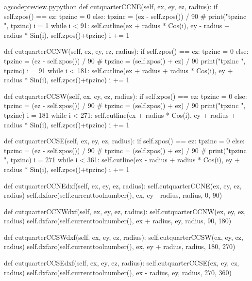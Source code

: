 \documentclass{ltxdoc}
\begin{document}
\lstset{firstnumber=\thegcpy}
\begin{writecode}{a}{gcodepreview.py}{python}
    def cutquarterCCNE(self, ex, ey, ez, radius):
        if self.zpos() == ez:
            tpzinc = 0
        else:
            tpzinc = (ez - self.zpos()) / 90
#        print("tpzinc ", tpzinc)
        i = 1
        while i < 91: 
            self.cutline(ex + radius * Cos(i), ey - radius + radius * Sin(i), self.zpos()+tpzinc)
            i += 1

    def cutquarterCCNW(self, ex, ey, ez, radius):
        if self.zpos() == ez:
            tpzinc = 0
        else:
            tpzinc = (ez - self.zpos()) / 90
#            tpzinc = (self.zpos() + ez) / 90
        print("tpzinc ", tpzinc)
        i = 91
        while i < 181: 
            self.cutline(ex + radius + radius * Cos(i), ey + radius * Sin(i), self.zpos()+tpzinc)
            i += 1

    def cutquarterCCSW(self, ex, ey, ez, radius):
        if self.zpos() == ez:
            tpzinc = 0
        else:
            tpzinc = (ez - self.zpos()) / 90
#            tpzinc = (self.zpos() + ez) / 90
        print("tpzinc ", tpzinc)
        i = 181
        while i < 271: 
            self.cutline(ex + radius * Cos(i), ey + radius + radius * Sin(i), self.zpos()+tpzinc)
            i += 1

    def cutquarterCCSE(self, ex, ey, ez, radius):
        if self.zpos() == ez:
            tpzinc = 0
        else:
            tpzinc = (ez - self.zpos()) / 90
#            tpzinc = (self.zpos() + ez) / 90
#        print("tpzinc ", tpzinc)
        i = 271
        while i < 361: 
            self.cutline(ex - radius + radius * Cos(i), ey + radius * Sin(i), self.zpos()+tpzinc)
            i += 1

    def cutquarterCCNEdxf(self, ex, ey, ez, radius):
        self.cutquarterCCNE(ex, ey, ez, radius)
        self.dxfarc(self.currenttoolnumber(), ex, ey - radius, radius,  0, 90)

    def cutquarterCCNWdxf(self, ex, ey, ez, radius):
        self.cutquarterCCNW(ex, ey, ez, radius)
        self.dxfarc(self.currenttoolnumber(), ex + radius, ey, radius, 90, 180)

    def cutquarterCCSWdxf(self, ex, ey, ez, radius):
        self.cutquarterCCSW(ex, ey, ez, radius)
        self.dxfarc(self.currenttoolnumber(), ex, ey + radius, radius, 180, 270)

    def cutquarterCCSEdxf(self, ex, ey, ez, radius):
        self.cutquarterCCSE(ex, ey, ez, radius)
        self.dxfarc(self.currenttoolnumber(), ex - radius, ey, radius, 270, 360)

\end{writecode}
\addtocounter{gcpy}{63}
\end{document}
